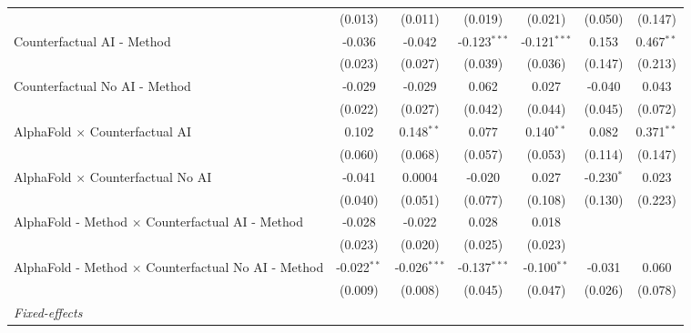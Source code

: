 \begin{tabular}{lcccccc}
                                                              & (0.013)       & (0.011)        & (0.019)        & (0.021)        & (0.050)      & (0.147)\\   
   Counterfactual AI - Method                                 & -0.036        & -0.042         & -0.123$^{***}$ & -0.121$^{***}$ & 0.153        & 0.467$^{**}$\\   
                                                              & (0.023)       & (0.027)        & (0.039)        & (0.036)        & (0.147)      & (0.213)\\   
   Counterfactual No AI - Method                              & -0.029        & -0.029         & 0.062          & 0.027          & -0.040       & 0.043\\   
                                                              & (0.022)       & (0.027)        & (0.042)        & (0.044)        & (0.045)      & (0.072)\\   
   AlphaFold $\times$ Counterfactual AI                       & 0.102         & 0.148$^{**}$   & 0.077          & 0.140$^{**}$   & 0.082        & 0.371$^{**}$\\   
                                                              & (0.060)       & (0.068)        & (0.057)        & (0.053)        & (0.114)      & (0.147)\\   
   AlphaFold $\times$ Counterfactual No AI                    & -0.041        & 0.0004         & -0.020         & 0.027          & -0.230$^{*}$ & 0.023\\   
                                                              & (0.040)       & (0.051)        & (0.077)        & (0.108)        & (0.130)      & (0.223)\\   
   AlphaFold - Method $\times$ Counterfactual AI - Method     & -0.028        & -0.022         & 0.028          & 0.018          &              &   \\   
                                                              & (0.023)       & (0.020)        & (0.025)        & (0.023)        &              &   \\   
   AlphaFold - Method $\times$ Counterfactual No AI - Method  & -0.022$^{**}$ & -0.026$^{***}$ & -0.137$^{***}$ & -0.100$^{**}$  & -0.031       & 0.060\\   
                                                              & (0.009)       & (0.008)        & (0.045)        & (0.047)        & (0.026)      & (0.078)\\   
   \midrule
   \emph{Fixed-effects}\\

\end{tabular}
